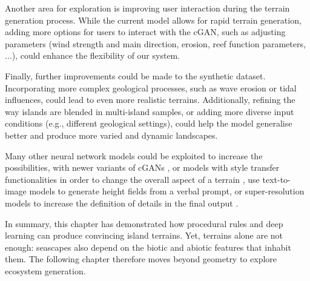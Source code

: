 Another area for exploration is improving user interaction during the terrain generation process. While the current model allows for rapid terrain generation, adding more options for users to interact with the cGAN, such as adjusting parameters (wind strength and main direction, erosion, reef function parameters, ...), could enhance the flexibility of our system.

Finally, further improvements could be made to the synthetic dataset. Incorporating more complex geological processes, such as wave erosion or tidal influences, could lead to even more realistic terrains. Additionally, refining the way islands are blended in multi-island samples, or adding more diverse input conditions (e.g., different geological settings), could help the model generalise better and produce more varied and dynamic landscapes.



Many other neural network models could be exploited to increase the possibilities, with newer variants of cGANs \cite{Park2019}, or models with style transfer functionalities \cite{Gatys2015,Zhu2020} in order to change the overall aspect of a terrain \cite{Perche2023a,Perche2023b}, use text-to-image models \cite{Rombach2021,Radford2021} to generate height fields from a verbal prompt, or super-resolution models \cite{Dong2014} to increase the definition of details in the final output \cite{Guerin2016a}.

In summary, this chapter has demonstrated how procedural rules and deep learning can produce convincing island terrains. Yet, terrains alone are not enough: seascapes also depend on the biotic and abiotic features that inhabit them. The following chapter therefore moves beyond geometry to explore ecosystem generation.
